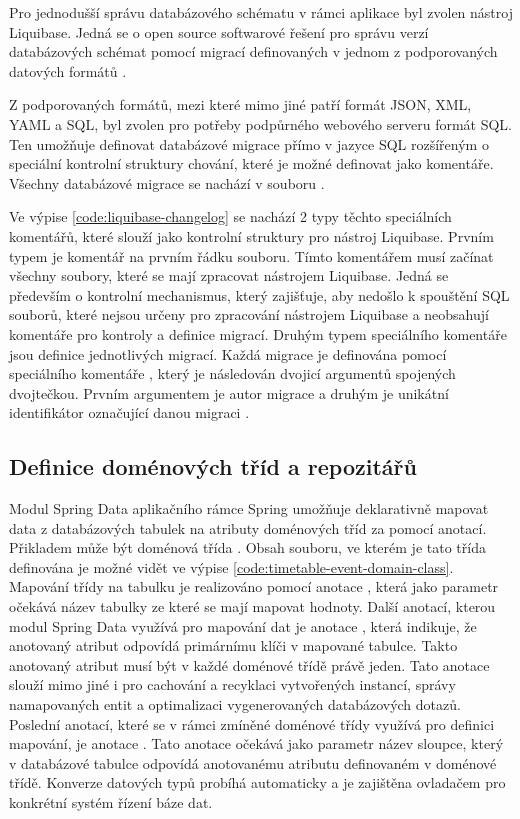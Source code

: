 Pro jednodušší správu databázového schématu v rámci aplikace byl zvolen nástroj Liquibase. Jedná se o open source softwarové řešení pro správu verzí databázových schémat pomocí migrací definovaných v jednom z podporovaných datových formátů \cite{liquibase_inc_2023}.

Z podporovaných formátů, mezi které mimo jiné patří formát JSON, XML, YAML a SQL, byl zvolen pro potřeby podpůrného webového serveru formát SQL. Ten umožňuje definovat databázové migrace přímo v jazyce SQL rozšířeným o speciální kontrolní struktury chování, které je možné definovat jako komentáře. Všechny databázové migrace se nachází v souboru .


Ve výpise \ref{code:liquibase-changelog} se nachází 2 typy těchto speciálních komentářů, které slouží jako kontrolní struktury pro nástroj Liquibase. Prvním typem je komentář  na prvním řádku souboru. Tímto komentářem musí začínat všechny soubory, které se mají zpracovat nástrojem Liquibase. Jedná se především o kontrolní mechanismus, který zajišťuje, aby nedošlo k spouštění SQL souborů, které nejsou určeny pro zpracování nástrojem Liquibase a neobsahují komentáře pro kontroly a definice migrací. Druhým typem speciálního komentáře jsou definice jednotlivých migrací. Každá migrace je definována pomocí speciálního komentáře , který je následován dvojicí argumentů spojených dvojtečkou. Prvním argumentem je autor migrace a druhým je unikátní identifikátor označující danou migraci \cite{liquibase_inc_sql_changelog}.

\subsection{Definice doménových tříd a repozitářů}

Modul Spring Data aplikačního rámce Spring umožňuje deklarativně mapovat data z databázových tabulek na atributy doménových tříd za pomocí anotací. Přikladem může být doménová třída . Obsah souboru, ve kterém je tato třída definována je možné vidět ve výpise \ref{code:timetable-event-domain-class}. Mapování třídy na tabulku je realizováno pomocí anotace , která jako parametr očekává název tabulky ze které se mají mapovat hodnoty. Další anotací, kterou modul Spring Data využívá pro mapování dat je anotace , která indikuje, že anotovaný atribut odpovídá primárnímu klíči v mapované tabulce. Takto anotovaný atribut musí být v každé doménové třídě právě jeden. Tato anotace slouží mimo jiné i pro cachování a recyklaci vytvořených instancí, správy namapovaných entit a optimalizaci vygenerovaných databázových dotazů. Poslední anotací, které se v rámci zmíněné doménové třídy využívá pro definici mapování, je anotace . Tato anotace očekává jako parametr název sloupce, který v databázové tabulce odpovídá anotovanému atributu definovaném v doménové třídě. Konverze datových typů probíhá automaticky a je zajištěna ovladačem pro konkrétní systém řízení báze dat.

